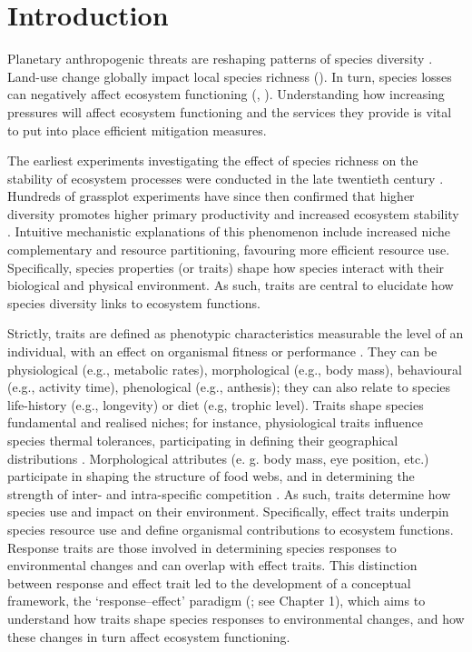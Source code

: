 \section{Introduction}
Planetary anthropogenic threats are reshaping patterns of species diversity \citep{ Spooner2018, Bohm2013, Schipper2008, Stuart2004}. Land-use change globally impact local species richness (\cite{Newbold2015}). In turn, species losses can negatively affect ecosystem functioning (\cite{Hooper2005}, \cite{Hooper2012}). Understanding how increasing pressures will affect ecosystem functioning and the services they provide is vital to put into place efficient mitigation measures.
   
The earliest experiments investigating the effect of species richness on the stability of ecosystem processes were conducted in the late twentieth century \citep{Tilman1994, Naeem1994}. Hundreds of grassplot experiments have since then confirmed that higher diversity promotes higher primary productivity and increased ecosystem stability \citep{Tilman2014, Balvanera2006}. Intuitive mechanistic explanations of this phenomenon include increased niche complementary and resource partitioning, favouring more efficient resource use. Specifically, species properties (or traits) shape how species interact with their biological and physical environment. As such, traits are central to elucidate how species diversity links to ecosystem functions. 

Strictly, traits are defined as phenotypic characteristics measurable the level of an individual, with an effect on organismal fitness or performance \citep{McGill2006, Violle2007}. They can be physiological (e.g., metabolic rates), morphological (e.g., body mass), behavioural (e.g., activity time), phenological (e.g., anthesis); they can also relate to species life-history (e.g., longevity) or diet (e.g, trophic level).
Traits shape species fundamental and realised niches; for instance, physiological traits influence species thermal tolerances, participating in defining their geographical distributions \citep{Calosi2010, Khaliq2017}. Morphological attributes (e. g. body mass, eye position, etc.) participate in shaping the structure of food webs, and in determining the strength of inter- and intra-specific competition \citep{Gravel2016, Laigle2018}. As such, traits determine how species use and impact on their environment. Specifically, effect traits underpin species resource use and define organismal contributions to ecosystem functions. Response traits are those involved in determining species responses to environmental changes and can overlap with effect traits. This distinction between response and effect trait led to the development of a conceptual framework, the `response--effect' paradigm (\cite{Lavorel2002,Luck2012}; see Chapter 1), which aims to understand how traits shape species responses to environmental changes, and how these changes in turn affect ecosystem functioning. 

